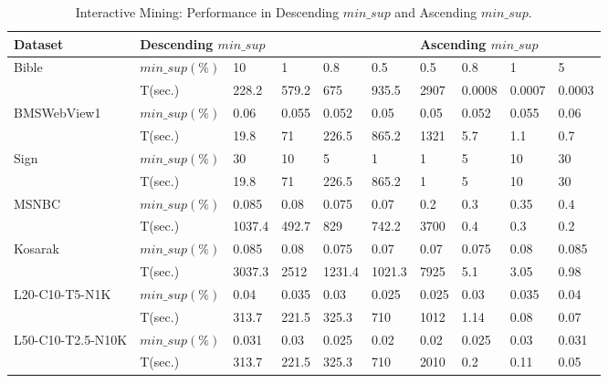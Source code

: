 \begin{table}[!htbp]
\centering
\begin{tabular}{|l|l|l|l|l|l|l|l|l|l|}
\hline
 Dataset & \multicolumn{5}{l|}{Descending $min\_sup$}  & \multicolumn{4}{l|}{Ascending $min\_sup$} \\
 \hline
 Bible & $min\_sup(\%)$ & 10 & 1 & 0.8 & 0.5 & 0.5 & 0.8 & 1 & 5\\
 & T(sec.) & 228.2 & 579.2 & 675 & 935.5 &  2907 & 0.0008 & 0.0007 & 0.0003\\
 \hline
 BMSWebView1 & $min\_sup(\%)$ & 0.06 & 0.055 & 0.052 & 0.05 & 0.05 & 0.052 & 0.055 & 0.06 \\
 & T(sec.) & 19.8 & 71 & 226.5 & 865.2 & 1321 & 5.7 & 1.1 & 0.7  \\
 \hline
 Sign & $min\_sup(\%)$ & 30 & 10 & 5 & 1 & 1  & 5 & 10 & 30 \\
 & T(sec.) & 19.8 & 71 & 226.5 & 865.2 & 1 & 5 & 10 & 30 \\
 \hline
 MSNBC & $min\_sup(\%)$ &  0.085 & 0.08 & 0.075 & 0.07 & 0.2 & 0.3 & 0.35 & 0.4 \\
 & T(sec.) & 1037.4 & 492.7 & 829 & 742.2 & 3700 & 0.4 & 0.3 & 0.2 \\
 \hline
 Kosarak & $min\_sup(\%)$ &0.085 & 0.08 & 0.075 & 0.07 & 0.07 & 0.075 & 0.08 & 0.085\\
 & T(sec.) & 3037.3 & 2512 & 1231.4 & 1021.3 & 7925 & 5.1 & 3.05 &0.98 \\
 \hline
 L20-C10-T5-N1K & $min\_sup(\%)$ & 0.04 & 0.035 & 0.03 & 0.025  & 0.025 & 0.03 & 0.035 & 0.04 \\
 & T(sec.) & 313.7 & 221.5 & 325.3 & 710 & 1012 & 1.14 & 0.08 & 0.07 \\
 \hline
 L50-C10-T2.5-N10K & $min\_sup(\%)$ & 0.031 & 0.03 & 0.025 & 0.02 & 0.02 & 0.025 & 0.03 & 0.031 \\
 & T(sec.) & 313.7 & 221.5 & 325.3 & 710 & 2010 & 0.2 & 0.11 & 0.05 \\
 \hline
\end{tabular}
\caption{Interactive Mining: Performance in Descending $min\_sup$ and Ascending $min\_sup$.}
\label{table:interactive_mining_descending_minsup}
\end{table}

